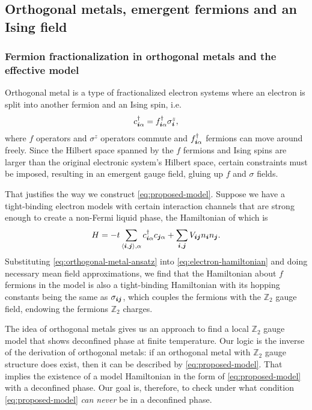 \documentclass[hyperref, a4paper]{article}
\newcommand*{\pair}[1]{\langle #1 \rangle}
\newcommand*{\Ztwo}{$\mathbb{Z}_2$ }
\begin{document}
\subsection{Orthogonal metals, emergent fermions and an Ising field}

\subsubsection{Fermion fractionalization in orthogonal metals and the effective model}

Orthogonal metal is a type of fractionalized electron systems where an electron is split into another fermion and an Ising spin, i.e.
\begin{equation}
    c^\dagger_{\vb*{i} \alpha} = f^\dagger_{\vb*{i} \alpha} \sigma^z_{\vb*{i}}, 
    \label{eq:orthogonal-metal-ansatz}
\end{equation}
where $f$ operators and $\sigma^z$ operators commute and $f^\dagger_{\vb*{i} \alpha}$ fermions can move around freely. 
Since the Hilbert space spanned by the $f$ fermions and Ising spins are larger than the original electronic system's Hilbert space, certain constraints must be imposed, resulting in an emergent gauge field, gluing up $f$ and $\sigma$ fields.

That justifies the way we construct \eqref{eq:proposed-model}.
Suppose we have a tight-binding electron models with certain interaction channels that are strong enough to create a non-Fermi liquid phase, the Hamiltonian of which is 
\begin{equation}
    H = - t \sum_{\pair{\vb*{i}, \vb*{j}}, \alpha} c^\dagger_{\vb*{i} \alpha} c_{\vb*{j} \alpha} + \sum_{\vb*{i}, \vb*{j}} V_{\vb*{i} \vb*{j}} n_{\vb*{i}} n_{\vb*{j}}.
    \label{eq:electron-hamiltonian}
\end{equation}
Substituting \eqref{eq:orthogonal-metal-ansatz} into \eqref{eq:electron-hamiltonian} and doing necessary mean field approximations, we find that the Hamiltonian about $f$ fermions in the model is also a tight-binding Hamiltonian with its hopping constants being the same as $\sigma_{\vb*{i} \vb*{j}}$, which couples the fermions with the \Ztwo gauge field, endowing the fermions \Ztwo charges.

The idea of orthogonal metals gives us an approach to find a local \Ztwo gauge model that shows deconfined phase at finite temperature.
Our logic is the inverse of the derivation of orthogonal metals: if an orthogonal metal with \Ztwo gauge structure does exist, then it can be described by \eqref{eq:proposed-model}.
That implies the existence of a model Hamiltonian in the form of \eqref{eq:proposed-model} with a deconfined phase.
Our goal is, therefore, to check under what condition \eqref{eq:proposed-model} \emph{can never} be in a deconfined phase.
\end{document}

